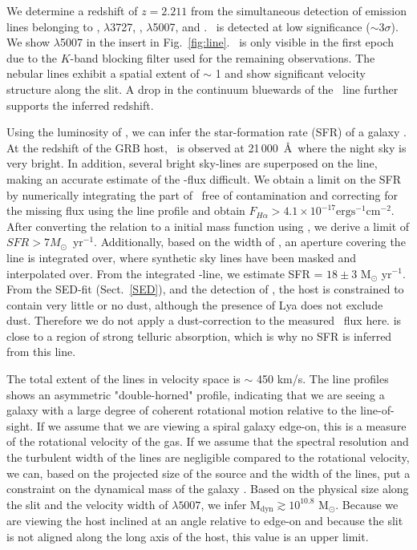 \documentclass{aa}    %
\begin{document}


We determine a redshift of $z = 2.211$ from the simultaneous detection of
emission lines belonging to \lya, \oii$\lambda$3727, \hb, \oiii$\lambda$5007,
and \ha. \hb~is detected at low significance ($\sim 3 \sigma$). We show
\oiii$\lambda$5007 in the insert in Fig.~\ref{fig:line}.  \ha~is only visible in
the first epoch due to the $K$-band blocking filter used for the remaining
observations. The nebular lines exhibit a spatial extent of $\sim$ 1 and
show significant velocity structure along the slit. A drop in the continuum
bluewards of the \lya~line further supports the inferred redshift.

Using the luminosity of \ha, we can infer the star-formation rate (SFR) of a
galaxy \citep{Kennicutt1998}. At the redshift of the GRB host, \ha~is observed
at 21\,000~\AA~where the night sky is very bright. In addition, several bright
sky-lines are superposed on the line, making an accurate estimate of the
\ha-flux difficult. We obtain a limit on the SFR by numerically integrating the
part of \ha~free of contamination and correcting for the missing flux using the
line profile and obtain $F_{H \alpha} > 4.1 \times 10^{-17} \mathrm{erg}
\mathrm{s}^{-1} \mathrm{cm}^{-2}$. After converting the \citet{Kennicutt1998}
relation to a \citet{Chabrier2003} initial mass function using
\citet{Madau2014}, we derive a limit of $SFR > 7 M_\odot$~yr$^{-1}$.
Additionally, based on the width of \oiii, an aperture covering the line is
integrated over, where synthetic sky lines \citep{Noll2012, Jones2013} have been
masked and interpolated over. From the integrated \ha-line, we estimate SFR =
$18 \pm 3$ M$_\odot$ yr$^{-1}$. From the SED-fit (Sect.~\ref{SED}), and the
detection of \lya, the host is constrained to contain very little or no dust,
although the presence of Lya does not exclude dust. Therefore we do not apply a
dust-correction to the measured \ha~flux here. \oii is close to a region of
strong telluric absorption, which is why no SFR is inferred from this line.

The total extent of the lines in velocity space is $\sim$ 450 km/s. The line
profiles shows an asymmetric "double-horned" profile, indicating that we are
seeing a galaxy with a large degree of coherent rotational motion relative to
the line-of-sight. If we assume that we are viewing a spiral galaxy edge-on,
this is a measure of the rotational velocity of the gas. If we assume that the
spectral resolution and the turbulent width of the lines are negligible compared
to the rotational velocity, we can, based on the projected size of the source
and the width of the lines, put a constraint on the dynamical mass of the galaxy
\citep{DeBlok2014}. Based on the physical size along the slit and the velocity
width of \oiii$\lambda5007$, we infer M$_\text{dyn} \gtrsim 10^{10.8}$
M$_\odot$. Because we are viewing the host inclined at an angle relative to
edge-on and because the slit is not aligned along the long axis of the host,
this value is an upper limit.
\end{document}
